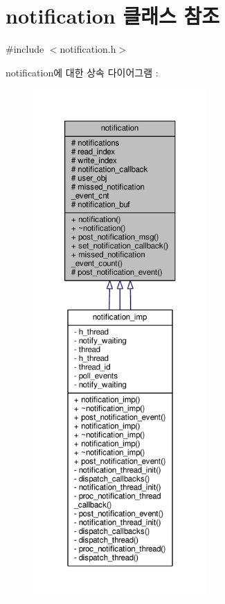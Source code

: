 \hypertarget{classavdecc__lib_1_1notification}{}\section{notification 클래스 참조}
\label{classavdecc__lib_1_1notification}


{\ttfamily \#include $<$notification.\+h$>$}



notification에 대한 상속 다이어그램 \+: 
\nopagebreak
\begin{figure}[H]
\begin{center}
\leavevmode
\includegraphics[height=550pt]{classavdecc__lib_1_1notification__inherit__graph}
\end{center}
\end{figure}


